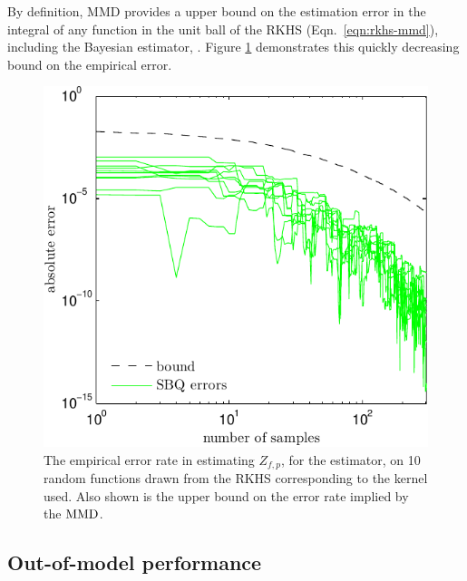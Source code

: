 \documentclass[]{article}
\begin{document}
By definition, MMD provides a upper bound on the estimation error in the integral of any function in the unit ball of the RKHS (Eqn.\ \eqref{eqn:rkhs-mmd}), including the Bayesian estimator, \sbq{}. Figure \ref{fig:bound_curve} demonstrates this quickly decreasing bound on the \sbq{} empirical error.

\begin{figure}
\includegraphics[width=\columnwidth]{figures/bound_curve_rkhs}
\caption{The empirical error rate in estimating $Z_{f,p}$,  for the \sbq{} estimator, on 10 random functions drawn from the RKHS corresponding to the kernel used.  Also shown is the upper bound on the error rate implied by the ${\rm MMD}$.}
\label{fig:bound_curve}
\end{figure}

\subsection{Out-of-model performance}
\end{document}
